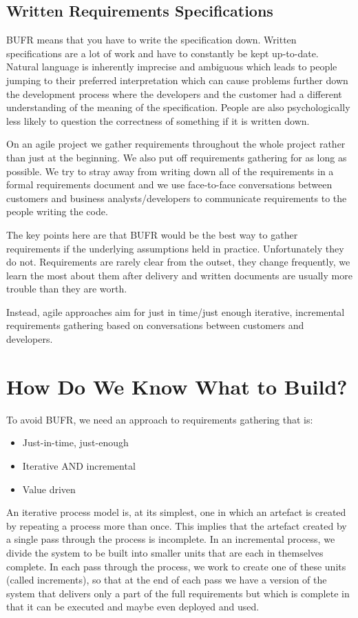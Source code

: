 \documentclass{article}
\begin{document}
\subsection{Written Requirements Specifications}
BUFR means that you have to write the specification down. Written specifications are a lot of work and have to constantly be kept up-to-date. Natural language is inherently imprecise and ambiguous which leads to people jumping to their preferred interpretation which can cause problems further down the development process where the developers and the customer had a different understanding of the meaning of the specification. People are also psychologically less likely to question the correctness of something if it is written down.

On an agile project we gather requirements throughout the whole project rather than just at the beginning. We also put off requirements gathering for as long as possible. We try to stray away from writing down all of the requirements in a formal requirements document and we use face-to-face conversations between customers and business analysts/developers to communicate requirements to the people writing the code.

The key points here are that BUFR would be the best way to gather requirements if the underlying assumptions held in practice. Unfortunately they do not. Requirements are rarely clear from the outset, they change frequently, we learn the most about them after delivery and written documents are usually more trouble than they are worth.

Instead, agile approaches aim for just in time/just enough iterative, incremental requirements gathering based on conversations between customers and developers.

\section{How Do We Know What to Build?}
To avoid BUFR, we need an approach to requirements gathering that is:
\begin{itemize}
	\item Just-in-time, just-enough
	\item Iterative AND incremental
	\item Value driven
\end{itemize}
An iterative process model is, at its simplest, one in which an artefact is created by repeating a process more than once. This implies that the artefact created by a single pass through the process is incomplete. In an incremental process, we divide the system to be built into smaller units that are each in themselves complete. In each pass through the process, we work to create one of these units (called increments), so that at the end of each pass we have a version of the system that delivers only a part of the full requirements but which is complete in that it can be executed and maybe even deployed and used.
\end{document}

